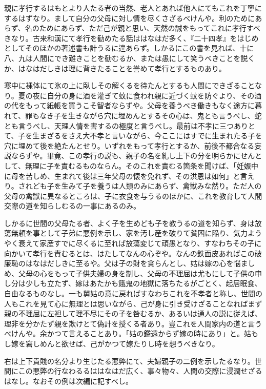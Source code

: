 \documentclass[a4paper, platex, dvipdfmx]{jsarticle}
\begin{document}
親に孝行するはもとより人たる者の当然、老人とあれば他人にてもこれを丁寧にするはずなり。まして自分の父母に対し情を尽くさざるべけんや。利のためにあらず、名のためにあらず、ただ己が親と思い、天然の誠をもってこれに孝行すべきなり。古来和漢にて孝行を勧めたる話ははなはだ多く、『二十四孝』をはじめとしてそのほかの著述書も計うるに遑あらず。しかるにこの書を見れば、十に八、九は人間にでき難きことを勧むるか、または愚にして笑うべきことを説くか、はなはだしきは理に背きたることを誉めて孝行とするものあり。

寒中に裸体にて氷の上に臥しその解くるを待たんとするも人間にできざることなり。夏の夜に自分の身に酒を灌ぎて蚊に食われ親に近づく蚊を防ぐより、その酒の代をもって紙帳を買うこそ智者ならずや。父母を養うべき働きもなく途方に暮れて、罪もなき子を生きながら穴に埋めんとするその心は、鬼とも言うべし、蛇とも言うべし、天理人情を害するの極度と言うべし。最前は不孝に三つありとて、子を生まざるをさえ大不孝と言いながら、今ここにはすでに生まれたる子を穴に埋めて後を絶たんとせり。いずれをもって孝行とするか、前後不都合なる妄説ならずや。畢竟、この孝行の説も、親子の名を糺し上下の分を明らかにせんとして、無理に子を責むるものならん。そのこれを責むる箇条を聞けば、「妊娠中に母を苦しめ、生まれて後は三年父母の懐を免れず、その洪恩は如何」と言えり。されども子を生みて子を養うは人類のみにあらず、禽獣みな然り。ただ人の父母の禽獣に異なるところは、子に衣食を与うるのほかに、これを教育して人間交際の道を知らしむるの一事にあるのみ。

しかるに世間の父母たる者、よく子を生めども子を教うるの道を知らず、身は放蕩無頼を事として子弟に悪例を示し、家を汚し産を破りて貧困に陥り、気力ようやく衰えて家産すでに尽くるに至れば放蕩変じて頑愚となり、すなわちその子に向かいて孝行を責むるとは、はたしてなんの心ぞや。なんの鉄面皮あればこの破廉恥のはなはだしきに至るや。父は子の財を貪らんとし、姑は嫁の心を悩ましめ、父母の心をもって子供夫婦の身を制し、父母の不理屈は尤もにして子供の申し分は少しも立たず、嫁はあたかも餓鬼の地獄に落ちたるがごとく、起居眠食、自由なるものなし。一も舅姑の意に戻ればすなわちこれを不孝者と称し、世間の人もこれを見て心に無理とは思いながら、己が身に引き受けざることなればまず親の不理屈に左袒して理不尽にその子を咎むるか、あるいは通人の説に従えば、理非を分かたず親を欺けとて偽計を授くる者あり。豈これを人間家内の道と言うべけんや。余かつて言えることあり。「姑の鑑遠からず嫁の時にあり」と。姑もし嫁を窘しめんと欲せば、己がかつて嫁たりし時を想うべきなり。

右は上下貴賤の名分より生じたる悪弊にて、夫婦親子の二例を示したるなり。世間にこの悪弊の行なわるるははなはだ広く、事々物々、人間の交際に浸潤せざるはなし。なおその例は次編に記すべし。
\end{document}
